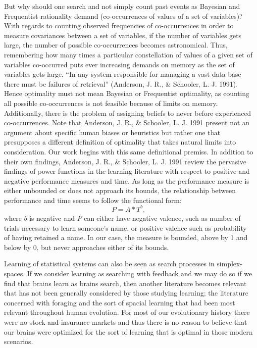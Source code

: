 But why should one search and not simply count past events as Bayesian and Frequentist rationality demand (co-occurrences of values of a set of variables)?  With regards to counting observed frequencies of co-occurrences in order to measure covariances between a set of variables, if the number of variables gets large, the number of possible co-occurrences becomes astronomical.  Thus, remembering how many times a particular constellation of values of a given set of variables co-occurred puts ever increasing demands on memory as the set of variables gets large.  ``In any system responsible for managing a vast data base there must be failures of retrieval'' (Anderson, J. R., \& Schooler, L. J. 1991).  Hence optimality must not mean Bayesian or Frequentist optimality, as counting all possible co-occurrences is not feasible because of limits on memory.  Additionally, there is the problem of assigning beliefs to never before experienced co-occurrences.  Note that Anderson, J. R., \& Schooler, L. J. 1991 present not an argument about specific human biases or heuristics but rather one that presupposes a different definition of optimality that takes natural limits into consideration.  Our work begins with this same definitional premiss.  In addition to their own findings, Anderson, J. R., \& Schooler, L. J. 1991 review the pervasive findings of power functions in the learning literature with respect to positive and negative performance measures and time.  As long as the performance measure is either unbounded or does not approach its bounds, the relationship between performance and time seems to follow the functional form:
$$P = A*T^{b},$$
where $b$ is negative and $P$ can either have negative valence, such as number of trials necessary to learn someone's name, or positive valence such as probability of having retained a name. In our case, the measure is bounded, above by 1 and below by 0, but never approaches either of its bounds. 

Learning of statistical systems can also be seen as search processes in simplex-spaces. If we consider learning as searching with feedback and we may do so if we find that brains learn as brains search, then another literature becomes relevant that has not been generally considered by those studying learning; the literature concerned with foraging and the sort of spacial learning that had been most relevant throughout human evolution.  For most of our evolutionary history there were no stock and insurance markets and thus there is no reason to believe that our brains were optimized for the sort of learning that is optimal in those modern scenarios.      


